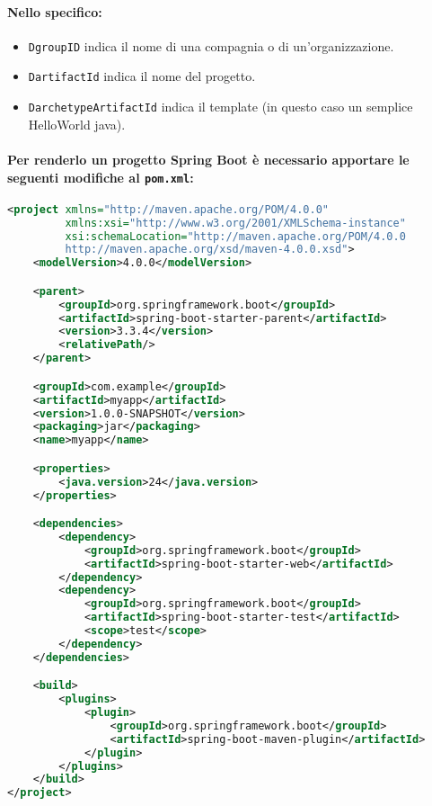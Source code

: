 \paragraph{Nello specifico:}

\begin{itemize}
	\item \texttt{DgroupID} indica il nome di una compagnia o di un'organizzazione.
	\item \texttt{DartifactId} indica il nome del progetto.
	\item \texttt{DarchetypeArtifactId} indica il template (in questo caso un semplice HelloWorld java).
\end{itemize}

\paragraph{Per renderlo un progetto Spring Boot è necessario apportare le seguenti modifiche al \texttt{pom.xml}:}

\begin{lstlisting}[language=xml, caption={Esempio di pom.xml per Spring Boot}]
<project xmlns="http://maven.apache.org/POM/4.0.0"
         xmlns:xsi="http://www.w3.org/2001/XMLSchema-instance"
         xsi:schemaLocation="http://maven.apache.org/POM/4.0.0
         http://maven.apache.org/xsd/maven-4.0.0.xsd">
    <modelVersion>4.0.0</modelVersion>

    <parent>
        <groupId>org.springframework.boot</groupId>
        <artifactId>spring-boot-starter-parent</artifactId>
        <version>3.3.4</version>
        <relativePath/>
    </parent>

    <groupId>com.example</groupId>
    <artifactId>myapp</artifactId>
    <version>1.0.0-SNAPSHOT</version>
    <packaging>jar</packaging>
    <name>myapp</name>

    <properties>
        <java.version>24</java.version>
    </properties>

    <dependencies>
        <dependency>
            <groupId>org.springframework.boot</groupId>
            <artifactId>spring-boot-starter-web</artifactId>
        </dependency>
        <dependency>
            <groupId>org.springframework.boot</groupId>
            <artifactId>spring-boot-starter-test</artifactId>
            <scope>test</scope>
        </dependency>
    </dependencies>

    <build>
        <plugins>
            <plugin>
                <groupId>org.springframework.boot</groupId>
                <artifactId>spring-boot-maven-plugin</artifactId>
            </plugin>
        </plugins>
    </build>
</project>
\end{lstlisting}
